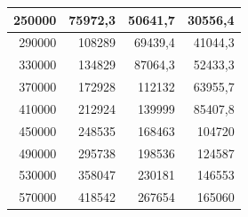 \documentclass[a4paper, 12pt]{article}
\begin{document}
\begin{longtable}[c]{@{}rrrr@{}}
	\multicolumn{1}{|r|}{250000}                  & \multicolumn{1}{r|}{75972,3}                & \multicolumn{1}{r|}{50641,7}                                                           & \multicolumn{1}{r|}{30556,4}                                                           \\* \midrule
	\multicolumn{1}{|r|}{290000}                  & \multicolumn{1}{r|}{108289}                 & \multicolumn{1}{r|}{69439,4}                                                           & \multicolumn{1}{r|}{41044,3}                                                           \\* \midrule
	\multicolumn{1}{|r|}{330000}                  & \multicolumn{1}{r|}{134829}                 & \multicolumn{1}{r|}{87064,3}                                                           & \multicolumn{1}{r|}{52433,3}                                                           \\* \midrule
	\multicolumn{1}{|r|}{370000}                  & \multicolumn{1}{r|}{172928}                 & \multicolumn{1}{r|}{112132}                                                            & \multicolumn{1}{r|}{63955,7}                                                           \\* \midrule
	\multicolumn{1}{|r|}{410000}                  & \multicolumn{1}{r|}{212924}                 & \multicolumn{1}{r|}{139999}                                                            & \multicolumn{1}{r|}{85407,8}                                                           \\* \midrule
	\multicolumn{1}{|r|}{450000}                  & \multicolumn{1}{r|}{248535}                 & \multicolumn{1}{r|}{168463}                                                            & \multicolumn{1}{r|}{104720}                                                            \\* \midrule
	\multicolumn{1}{|r|}{490000}                  & \multicolumn{1}{r|}{295738}                 & \multicolumn{1}{r|}{198536}                                                            & \multicolumn{1}{r|}{124587}                                                            \\* \midrule
	\multicolumn{1}{|r|}{530000}                  & \multicolumn{1}{r|}{358047}                 & \multicolumn{1}{r|}{230181}                                                            & \multicolumn{1}{r|}{146553}                                                            \\* \midrule
	\multicolumn{1}{|r|}{570000}                  & \multicolumn{1}{r|}{418542}                 & \multicolumn{1}{r|}{267654}                                                            & \multicolumn{1}{r|}{165060}                                                            \\* \midrule

\end{longtable}
\end{document}
